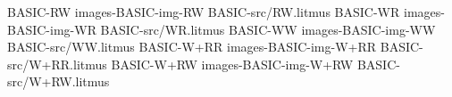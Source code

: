 %
\def\csname RW@base\endcsname{BASIC-RW}%
\def\csname RW@img\endcsname{\csname images-BASIC-img-RW\endcsname}%
\def\csname RW@src\endcsname{BASIC-src/RW.litmus}%
%
\def\csname WR@base\endcsname{BASIC-WR}%
\def\csname WR@img\endcsname{\csname images-BASIC-img-WR\endcsname}%
\def\csname WR@src\endcsname{BASIC-src/WR.litmus}%
%
\def\csname WW@base\endcsname{BASIC-WW}%
\def\csname WW@img\endcsname{\csname images-BASIC-img-WW\endcsname}%
\def\csname WW@src\endcsname{BASIC-src/WW.litmus}%
%
\def\csname W+RR@base\endcsname{BASIC-W+RR}%
\def\csname W+RR@img\endcsname{\csname images-BASIC-img-W+RR\endcsname}%
\def\csname W+RR@src\endcsname{BASIC-src/W+RR.litmus}%
%
\def\csname W+RW@base\endcsname{BASIC-W+RW}%
\def\csname W+RW@img\endcsname{\csname images-BASIC-img-W+RW\endcsname}%
\def\csname W+RW@src\endcsname{BASIC-src/W+RW.litmus}%
%
\def\BASIC{%
\ahref{\base{RW}.html}{\textsf{RW}}%
, \ahref{\base{WR}.html}{\textsf{WR}}%
, \ahref{\base{WW}.html}{\textsf{WW}}%
, \ahref{\base{W+RR}.html}{\textsf{W+RR}}%
{} and \ahref{\base{W+RW}.html}{\textsf{W+RW}}%
}%
\def\applyBASIC#1{%
#1{RW}%
#1{WR}%
#1{WW}%
#1{W+RR}%
#1{W+RW}%
}%
